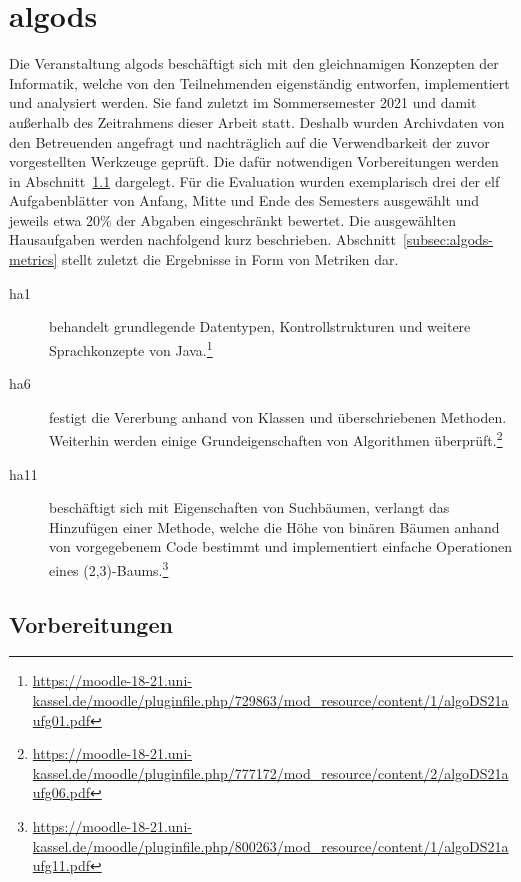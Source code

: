 \section{\acl{algods}}\label{sec:algods-2021}

Die Veranstaltung \ac{algods} beschäftigt sich mit den gleichnamigen Konzepten der Informatik, welche von den Teilnehmenden eigenständig entworfen, implementiert und analysiert werden.
Sie fand zuletzt im Sommersemester 2021 und damit außerhalb des Zeitrahmens dieser Arbeit statt.
Deshalb wurden Archivdaten von den Betreuenden angefragt und nachträglich auf die Verwendbarkeit der zuvor vorgestellten Werkzeuge geprüft.
Die dafür notwendigen Vorbereitungen werden in Abschnitt~\ref{subsec:algods-preparations} dargelegt.
Für die Evaluation wurden exemplarisch drei der elf Aufgabenblätter von Anfang, Mitte und Ende des Semesters ausgewählt und jeweils etwa 20\% der Abgaben eingeschränkt bewertet.
Die ausgewählten Hausaufgaben werden nachfolgend kurz beschrieben.
Abschnitt~\ref{subsec:algods-metrics} stellt zuletzt die Ergebnisse in Form von Metriken dar.

\begin{description}
    \item[\ac{ha}1] behandelt grundlegende Datentypen, Kontrollstrukturen und weitere Sprachkonzepte von Java.\footnote{
        \url{https://moodle-18-21.uni-kassel.de/moodle/pluginfile.php/729863/mod_resource/content/1/algoDS21aufg01.pdf}
    }
    \item[\ac{ha}6] festigt die Vererbung anhand von Klassen und überschriebenen Methoden.
    Weiterhin werden einige Grundeigenschaften von Algorithmen überprüft.\footnote{
        \url{https://moodle-18-21.uni-kassel.de/moodle/pluginfile.php/777172/mod_resource/content/2/algoDS21aufg06.pdf}
    }
    \item[\ac{ha}11] beschäftigt sich mit Eigenschaften von Suchbäumen, verlangt das Hinzufügen einer Methode, welche die Höhe von binären Bäumen anhand von vorgegebenem Code bestimmt und implementiert einfache Operationen eines (2,3)-Baums.\footnote{
        \url{https://moodle-18-21.uni-kassel.de/moodle/pluginfile.php/800263/mod_resource/content/1/algoDS21aufg11.pdf}
    }
\end{description}

\subsection{Vorbereitungen}\label{subsec:algods-preparations}

